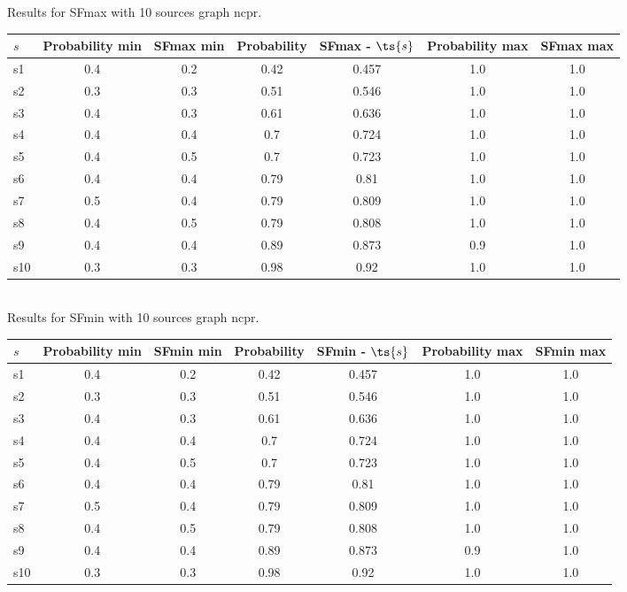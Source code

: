 \documentclass{article}
\begin{document}
\noindent Results for SFmax with 10 sources graph ncpr.

\noindent\begin{tabular}{|l|c|c|c|c|c|c|}
\hline
$s$& Probability min & SFmax min & Probability & SFmax - $\ts{s}$ & Probability max & SFmax max\\
\hline
s1 &0.4 & 0.2 & 0.42 & 0.457 & 1.0 & 1.0\\
\hline
s2 &0.3 & 0.3 & 0.51 & 0.546 & 1.0 & 1.0\\
\hline
s3 &0.4 & 0.3 & 0.61 & 0.636 & 1.0 & 1.0\\
\hline
s4 &0.4 & 0.4 & 0.7 & 0.724 & 1.0 & 1.0\\
\hline
s5 &0.4 & 0.5 & 0.7 & 0.723 & 1.0 & 1.0\\
\hline
s6 &0.4 & 0.4 & 0.79 & 0.81 & 1.0 & 1.0\\
\hline
s7 &0.5 & 0.4 & 0.79 & 0.809 & 1.0 & 1.0\\
\hline
s8 &0.4 & 0.5 & 0.79 & 0.808 & 1.0 & 1.0\\
\hline
s9 &0.4 & 0.4 & 0.89 & 0.873 & 0.9 & 1.0\\
\hline
s10 &0.3 & 0.3 & 0.98 & 0.92 & 1.0 & 1.0\\
\hline
\end{tabular}\\

\noindent Results for SFmin with 10 sources graph ncpr.

\noindent\begin{tabular}{|l|c|c|c|c|c|c|}
\hline
$s$& Probability min & SFmin min & Probability & SFmin - $\ts{s}$ & Probability max & SFmin max\\
\hline
s1 &0.4 & 0.2 & 0.42 & 0.457 & 1.0 & 1.0\\
\hline
s2 &0.3 & 0.3 & 0.51 & 0.546 & 1.0 & 1.0\\
\hline
s3 &0.4 & 0.3 & 0.61 & 0.636 & 1.0 & 1.0\\
\hline
s4 &0.4 & 0.4 & 0.7 & 0.724 & 1.0 & 1.0\\
\hline
s5 &0.4 & 0.5 & 0.7 & 0.723 & 1.0 & 1.0\\
\hline
s6 &0.4 & 0.4 & 0.79 & 0.81 & 1.0 & 1.0\\
\hline
s7 &0.5 & 0.4 & 0.79 & 0.809 & 1.0 & 1.0\\
\hline
s8 &0.4 & 0.5 & 0.79 & 0.808 & 1.0 & 1.0\\
\hline
s9 &0.4 & 0.4 & 0.89 & 0.873 & 0.9 & 1.0\\
\hline
s10 &0.3 & 0.3 & 0.98 & 0.92 & 1.0 & 1.0\\
\hline
\end{tabular}\\
\end{document}
